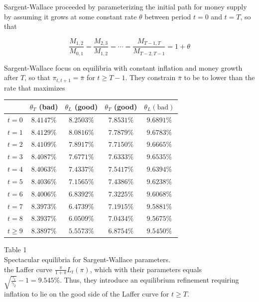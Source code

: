 \documentclass[10pt]{article}
\begin{document}
Sargent-Wallace proceeded by parameterizing the initial path for money supply by assuming it grows at some constant rate $\theta$ between period $t=0$ and $t=T$, so that

\begin{equation*}
\frac{M_{1,2}}{M_{0,1}}=\frac{M_{2,3}}{M_{1,2}}=\cdots=\frac{M_{T-1, T}}{M_{T-2, T-1}}=1+\theta
\end{equation*}

Sargent-Wallace focus on equilibria with constant inflation and money growth after $T$, so that $\pi_{t, t+1}=\bar{\pi}$ for $t \geq T-1$. They constrain $\bar{\pi}$ to be to lower than the rate that maximizes

\begin{center}
\begin{tabular}{ccccc}
 & $\theta_{T}$ (bad) & $\theta_{L}$ (good) & $\theta_{T}$ (good) & $\theta_{L}(\mathrm{bad})$ \\
\hline\hline
$t=0$ & $8.4147 \%$ & $8.2503 \%$ & $7.8531 \%$ & $9.6891 \%$ \\
$t=1$ & $8.4129 \%$ & $8.0816 \%$ & $7.7879 \%$ & $9.6783 \%$ \\
$t=2$ & $8.4109 \%$ & $7.8917 \%$ & $7.7150 \%$ & $9.6665 \%$ \\
$t=3$ & $8.4087 \%$ & $7.6771 \%$ & $7.6333 \%$ & $9.6535 \%$ \\
$t=4$ & $8.4063 \%$ & $7.4337 \%$ & $7.5417 \%$ & $9.6394 \%$ \\
$t=5$ & $8.4036 \%$ & $7.1565 \%$ & $7.4386 \%$ & $9.6238 \%$ \\
$t=6$ & $8.4006 \%$ & $6.8392 \%$ & $7.3225 \%$ & $9.6068 \%$ \\
$t=7$ & $8.3973 \%$ & $6.4739 \%$ & $7.1915 \%$ & $9.5881 \%$ \\
$t=8$ & $8.3937 \%$ & $6.0509 \%$ & $7.0434 \%$ & $9.5675 \%$ \\
$t \geq 9$ & $8.3897 \%$ & $5.5573 \%$ & $6.8754 \%$ & $9.5450 \%$ \\
\end{tabular}
\end{center}

Table 1\\
Spectacular equilibria for Sargent-Wallace parameters.\\
the Laffer curve $\frac{\pi}{1+\pi} L_{t}(\pi)$, which with their parameters equals $\sqrt{\frac{\gamma_{1}}{\gamma_{2}}}-1=9.545 \%$. Thus, they introduce an equilibrium refinement requiring inflation to lie on the good side of the Laffer curve for $t \geq T$.
\end{document}
